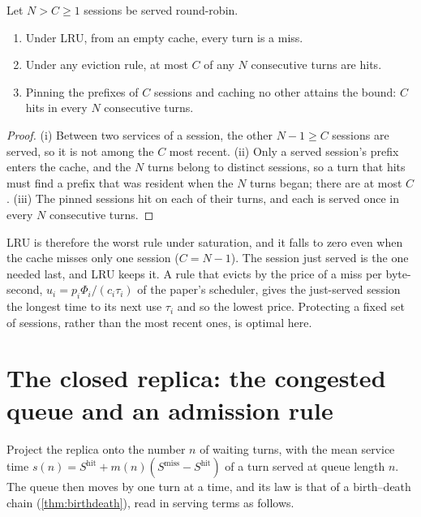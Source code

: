 \begin{proposition}\label{L7:prop:rounds}
Let $N>C\ge1$ sessions be served round-robin.
\begin{enumerate}[label=(\roman*)]
\item Under LRU, from an empty cache, every turn is a miss.
\item Under any eviction rule, at most $C$ of any $N$ consecutive turns are hits.
\item Pinning the prefixes of $C$ sessions and caching no other attains the bound: $C$
  hits in every $N$ consecutive turns.
\end{enumerate}
\end{proposition}
\begin{proof}
(i) Between two services of a session, the other $N-1\ge C$ sessions are served, so it
is not among the $C$ most recent. (ii) Only a served session's prefix enters the cache, and
the $N$ turns belong to distinct sessions, so a turn that hits must find a prefix that
was resident when the $N$ turns began; there are at most $C$. (iii) The pinned sessions
hit on each of their turns, and each is served once in every $N$ consecutive turns.
\end{proof}

LRU is therefore the worst rule under saturation, and it falls to zero even when the
cache misses only one session ($C=N-1$). The session just served is the one needed
last, and LRU keeps it. A rule that evicts by the price of a miss per byte-second,
$u_i=p_i\Phi_i/(c_i\tau_i)$ of the paper's scheduler, gives the just-served session the
longest time to its next use $\tau_i$ and so the lowest price. Protecting a fixed set
of sessions, rather than the most recent ones, is optimal here.

\section{The closed replica: the congested queue and an admission rule}\label{L7:sec:open}

Project the replica onto the number $n$ of waiting turns, with the mean service time
$s(n)=S^{\mathrm{hit}}+m(n)(S^{\mathrm{miss}}-S^{\mathrm{hit}})$ of a turn served at
queue length $n$. The queue then moves by one turn at a time, and its law is that of a
birth--death chain (\cref{thm:birthdeath}), read in serving terms as follows.

